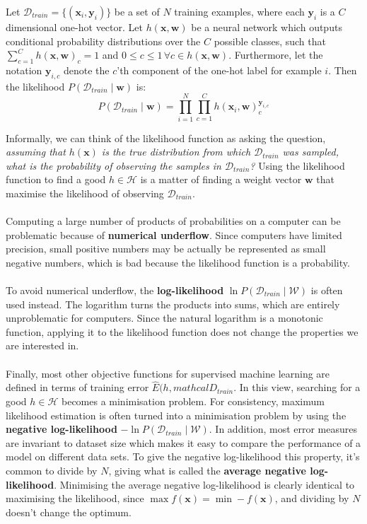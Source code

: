 \begin{definition}
	\label{likelihood}
	Let $\mathcal{D}_{train} = \{(\mathbf{x}_i, \mathbf{y}_i)\}$ be a set of $N$ training examples, where each $\mathbf{y}_i$ is a $C$ dimensional one-hot vector. Let $h(\mathbf{x}, \mathbf{w})$ be a neural network which outputs conditional probability distributions over the $C$ possible classes, such that $\sum_{c=1}^C h(\mathbf{x}, \mathbf{w})_c = 1$ and $0 \leq c \leq 1 \,\forall c \in h(\mathbf{x}, \mathbf{w})$. Furthermore, let the notation $\mathbf{y}_{i,c}$ denote the $c$'th component of the one-hot label for example $i$. Then the likelihood $P(\mathcal{D}_{train} \mid \mathbf{w})$ is:
	$$
	P(\mathcal{D}_{train} \mid \mathbf{w}) = \prod\limits_{i=1}^N\prod\limits_{c=1}^C h(\mathbf{x}_i, \mathbf{w})_c^{\mathbf{y}_{i,c}}
	$$
\end{definition}
\noindent
Informally, we can think of the likelihood function as asking the question, \textit{assuming that $h(\mathbf{x})$ is the true distribution from which $\mathcal{D}_{train}$ was sampled, what is the probability of observing the samples in $\mathcal{D}_{train}$?} Using the likelihood function to find a good $h \in \mathcal{H}$ is a matter of finding a weight vector $\mathbf{w}$ that maximise the likelihood of observing $\mathcal{D}_{train}$.
\\\\ 
Computing a large number of products of probabilities on a computer can be problematic because of \textbf{numerical underflow}. Since computers have limited precision, small positive numbers may be actually be represented as small negative numbers, which is bad because the likelihood function is a probability.
\\\\
To avoid numerical underflow, the \textbf{log-likelihood} $\ln P(\mathcal{D}_{train} \mid \mathcal{W})$ is often used instead. The logarithm turns the products into sums, which are entirely unproblematic for computers. Since the natural logarithm is a monotonic function, applying it to the likelihood function does not change the properties we are interested in.
\\\\
Finally, most other objective functions for supervised machine learning are defined in terms of training error $\hat{E}(h, mathcal{D}_{train}$. In this view, searching for a good $h \in \mathcal{H}$ becomes a minimisation problem. For consistency, maximum likelihood estimation is often turned into a minimisation problem by using the \textbf{negative log-likelihood} $-\ln P(\mathcal{D}_{train} \mid \mathcal{W})$. In addition, most error measures are invariant to dataset size which makes it easy to compare the performance of a model on different data sets. To give the negative log-likelihood this property, it's common to divide by $N$, giving what is called the \textbf{average negative log-likelihood}. Minimising the average negative log-likelihood is clearly identical to maximising the likelihood, since $\max f(\mathbf{x}) = \min -f(\mathbf{x})$, and dividing by $N$ doesn't change the optimum.

